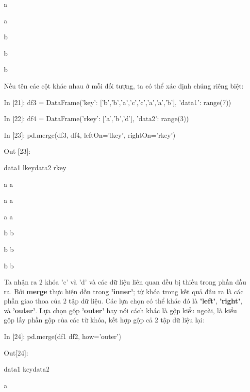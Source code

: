      \quad{} \quad a \quad{}\par
     \quad{} \quad a \quad{}\par
     \quad{} \quad b \quad{}\par
     \quad{} \quad b \quad{}\par
     \quad{} \quad b \quad{}\par
Nếu tên các cột khác nhau ở mỗi đối tượng, ta có thể xác định chúng riêng biệt: \par
   \quad\textup{In [21]: df3 = DataFrame({'key': ['b','b','a','c','c','a','a','b'], 'data1': range(7)})}\par
   \quad\textup{In [22]: df4 = DataFrame({'rkey': ['a','b','d'], 'data2': range(3)})}\par
   \quad\textup{In [23]: pd.merge(df3, df4, leftOn='lkey', rightOn='rkey')}\par
    \quad\textup{Out [23]: }\par 
    \quad\quad\textup{data1 lkey\quad data2 \quad rkey}\par
     \quad{} \quad a \quad{}\quad\quad\quad a\par
     \quad{} \quad a \quad{}\quad\quad\quad a\par
     \quad{} \quad a \quad{}\quad\quad\quad a\par
     \quad{} \quad b \quad{}\quad\quad\quad b\par
     \quad{} \quad b \quad{}\quad\quad\quad b\par
     \quad{} \quad b \quad{}\quad\quad\quad b\par
Ta nhận ra 2 khóa 'c' và 'd' và các dữ liệu liên quan đều bị thiếu trong phần đầu ra. Bởi \textbf{merge} thực hiện dồn trong \textbf{'inner'}; từ khóa trong kết quả đầu ra là các phần giao thoa của 2 tập dữ liệu. Các lựa chọn có thể khác đó là \textbf{'left'}, \textbf{'right'}, và \textbf{'outer'}. Lựa chọn gộp \textbf{'outer'} hay nói cách khác là gộp kiểu ngoài, là kiểu gộp lấy phần gộp của các từ khóa, kết hợp gộp cả 2 tập dữ liệu lại:\par
    \quad\textup{In [24]: pd.merge(df1 df2, how='outer')}\par
    \quad\textup{Out[24]:}\par
    \quad\quad\textup{data1 key\quad data2}\par
     \quad{} \quad a \quad{}\par
